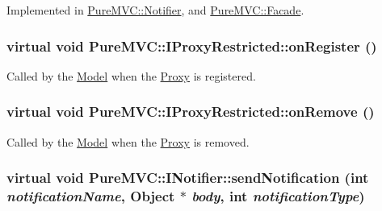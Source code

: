 Implemented in \hyperlink{class_pure_m_v_c_1_1_notifier_a6910365c70415ba7973401215f57e4af}{PureMVC::Notifier}, and \hyperlink{class_pure_m_v_c_1_1_facade_a94c72ff29f9f42ff084f247b180fb4ad}{PureMVC::Facade}.\hypertarget{class_pure_m_v_c_1_1_i_proxy_restricted_a450f14bba0bde7c94e5868e844f1fdf2}{
\subsubsection[{onRegister}]{\setlength{\rightskip}{0pt plus 5cm}virtual void PureMVC::IProxyRestricted::onRegister ()}}
\label{class_pure_m_v_c_1_1_i_proxy_restricted_a450f14bba0bde7c94e5868e844f1fdf2}


Called by the \hyperlink{class_pure_m_v_c_1_1_model}{Model} when the \hyperlink{class_pure_m_v_c_1_1_proxy}{Proxy} is registered. \hypertarget{class_pure_m_v_c_1_1_i_proxy_restricted_a6d883fcf5a5e241321f5b5d9521ba158}{
\subsubsection[{onRemove}]{\setlength{\rightskip}{0pt plus 5cm}virtual void PureMVC::IProxyRestricted::onRemove ()}}
\label{class_pure_m_v_c_1_1_i_proxy_restricted_a6d883fcf5a5e241321f5b5d9521ba158}


Called by the \hyperlink{class_pure_m_v_c_1_1_model}{Model} when the \hyperlink{class_pure_m_v_c_1_1_proxy}{Proxy} is removed. \hypertarget{class_pure_m_v_c_1_1_i_notifier_a65e8333ccfea74138b79f84dac96af25}{
\subsubsection[{sendNotification}]{\setlength{\rightskip}{0pt plus 5cm}virtual void PureMVC::INotifier::sendNotification (int {\em notificationName}, \/  {\bf Object} $\ast$ {\em body}, \/  int {\em notificationType})}}
\label{class_pure_m_v_c_1_1_i_notifier_a65e8333ccfea74138b79f84dac96af25}


